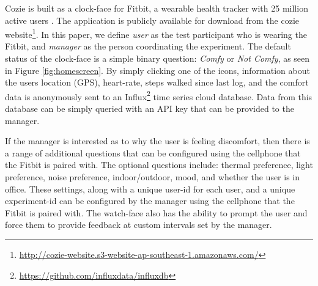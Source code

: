 
Cozie is built as a clock-face for Fitbit, a wearable health tracker with 25 million active users \cite{fibit2018}. The application is publicly available for download from the cozie website\footnote{\url{http://cozie-website.s3-website-ap-southeast-1.amazonaws.com/}}. In this paper, we define \emph{user} as the test participant who is wearing the Fitbit, and \emph{manager} as the person coordinating the experiment. The default status of the clock-face is a simple binary question: \emph{Comfy} or \emph{Not Comfy}, as seen in Figure \ref{fig:homescreen}. By simply clicking one of the icons, information about the users location (GPS), heart-rate, steps walked since last log, and the comfort data is anonymously sent to an Influx\footnote{\url{https://github.com/influxdata/influxdb}} time series cloud database. Data from this database can be simply queried with an API key that can be provided to the manager. 

If the manager is interested as to why the user is feeling discomfort, then there is a range of additional questions that can be configured using the cellphone that the Fitbit is paired with. The optional questions include: thermal preference, light preference, noise preference, indoor/outdoor, mood, and whether the user is in office. These settings, along with a unique user-id for each user, and a unique experiment-id can be configured by the manager using the cellphone that the Fitbit is paired with. The watch-face also has the ability to prompt the user and force them to provide feedback at custom intervals set by the manager.



